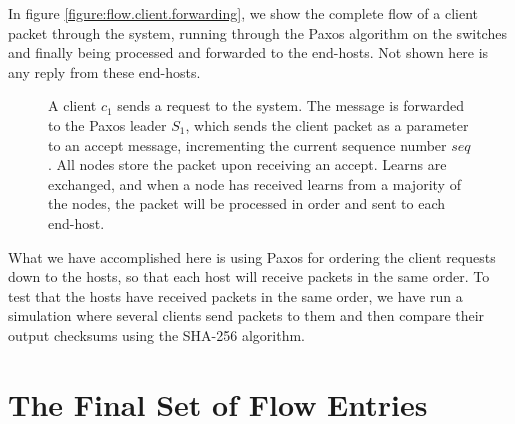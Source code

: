 In figure \vref{figure:flow.client.forwarding}, we show the complete flow of
a client packet through the system, running through the Paxos algorithm on
the switches and finally being processed and forwarded to the end-hosts.
Not shown here is any reply from these end-hosts.

\begin{figure}
  \centering
  \scriptsize
  \caption{A client $c_1$ sends a request to the system. The message is
    forwarded to the Paxos leader $S_1$, which sends the client packet as a
      parameter to an accept message, incrementing the current sequence
      number $seq$.  All nodes store the packet upon receiving an accept.
      Learns are exchanged, and when a node has received learns from a
      majority of the nodes, the packet will be processed in order and sent
      to each end-host.}
  \label{flow:simple}
\end{figure}

What we have accomplished here is using Paxos for
ordering the client
requests down to the hosts, so that each host will receive packets in the
same order.  To test that the hosts have received packets in the same order,
we have run a simulation where several clients send packets to them and then
compare their output checksums using the SHA-256 algorithm.

\section{The Final Set of Flow Entries}
\label{chapter:final.flowtable}

